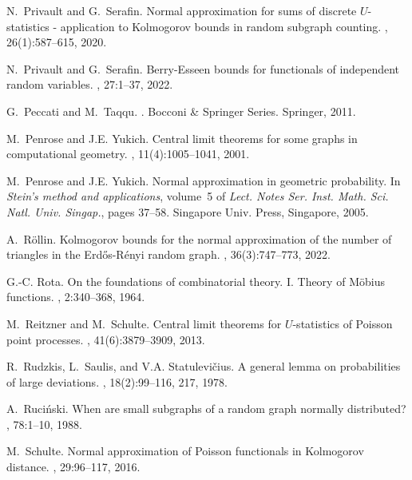 \documentclass[12pt]{article}
\let\Horig\H
\numberwithin{equation}{section}
\begin{document}
\begin{thebibliography}{BRSW17}
N.~Privault and G.~Serafin.
\newblock Normal approximation for sums of discrete {$U$}-statistics -
  application to {K}olmogorov bounds in random subgraph counting.
, 26(1):587--615, 2020.

N.~Privault and G.~Serafin.
\newblock Berry-{E}sseen bounds for functionals of independent random
  variables.
, 27:1--37, 2022.

G.~Peccati and M.~Taqqu.
.
\newblock Bocconi \& Springer Series. Springer, 2011.

M.~Penrose and J.E. Yukich.
\newblock Central limit theorems for some graphs in computational geometry.
, 11(4):1005--1041, 2001.

M.~Penrose and J.E. Yukich.
\newblock Normal approximation in geometric probability.
\newblock In {\em Stein's method and applications}, volume~5 of {\em Lect.
  Notes Ser. Inst. Math. Sci. Natl. Univ. Singap.}, pages 37--58. Singapore
  Univ. Press, Singapore, 2005.

A.~R{\"o}llin.
\newblock Kolmogorov bounds for the normal approximation of the number of
  triangles in the {E}rd{\Horig{o}}s-{R}\'enyi random graph.
,
  36(3):747--773, 2022.

G.-C. Rota.
\newblock On the foundations of combinatorial theory. {I}. {T}heory of
  {M}\"obius functions.
, 2:340--368,
  1964.

M.~Reitzner and M.~Schulte.
\newblock Central limit theorems for ${U}$-statistics of {P}oisson point
  processes.
, 41(6):3879--3909, 2013.

R.~Rudzkis, L.~Saulis, and V.A. Statulevi\v{c}ius.
\newblock A general lemma on probabilities of large deviations.
, 18(2):99--116, 217, 1978.

A.~Ruci{\'n}ski.
\newblock When are small subgraphs of a random graph normally distributed?
, 78:1--10, 1988.

M.~Schulte.
\newblock Normal approximation of {P}oisson functionals in {K}olmogorov
  distance.
, 29:96--117, 2016.


\end{thebibliography}
\end{document}

